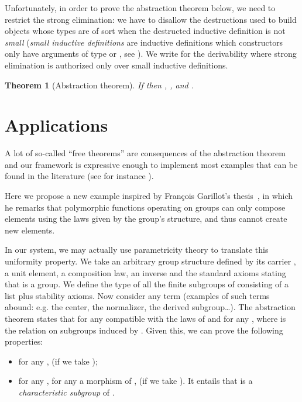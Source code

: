 \documentclass[conference,a4paper]{IEEEtran}
\newtheorem{thm}{Theorem}
\begin{document}
Unfortunately, in order to prove the abstraction
theorem below, we need to restrict the strong elimination: we have to disallow the  destructions 
used to build objects whose types are of sort  when the destructed inductive 
definition is not \emph{small} (\emph{small inductive definitions} are inductive 
definitions which constructors only have arguments of type  or , 
see  \cite{springerlink:10.1007/BFb0037116}). 
We write  for the derivability  where strong elimination is
authorized only over small 
inductive definitions. 

\begin{thm}[\label{AbstractionInductive}Abstraction theorem] 
  If  then , , and
      .
\end{thm}

\section{Applications}\label{sec:application}

A lot of so-called ``free theorems'' are consequences of the 
abstraction theorem and our framework is expressive enough to 
implement most examples that can be found in the literature (see for instance \cite{Wadler89, DBLP:conf/icfp/BernardyJP10}). 

Here we propose a new example inspired by François Garillot's
thesis~\cite{Garillot11}, in which he remarks that polymorphic functions
operating on groups can only compose elements using the laws given by the
group's structure, and thus cannot create new elements. 

In our system, we may actually use parametricity theory to translate this
uniformity property. We take an arbitrary group structure
 defined by its carrier , a unit element, a composition law, an inverse
and the standard axioms stating that
 is a group. We define  the type of all the
finite subgroups of  consisting of a list plus stability axioms.
Now consider any term  (examples of such terms abound:
e.g. the center, the normalizer, the derived subgroup\dots). The abstraction
theorem states that for any  compatible with the
laws of  and for any ,  where  is the relation on subgroups
induced by . Given this, we can prove the following properties:
\begin{itemize} \item for any ,  (if we take ); \item for any , for any  a morphism of
,  (if we take ).  It entails that  is a \emph{characteristic subgroup} of
.  \end{itemize}
\end{document}
